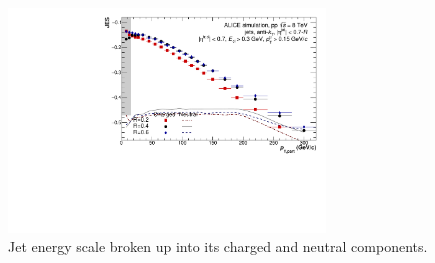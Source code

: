 \begin{figure}[hbt!]
    \centering
    \includegraphics[width=0.75\textwidth]{figures/EnergyScale/ROrdering/JES_8_3_ChNe.pdf}
    \caption{Jet energy scale broken up into its charged and neutral components.}
    \label{fig:eScaleChNe}
\end{figure}


